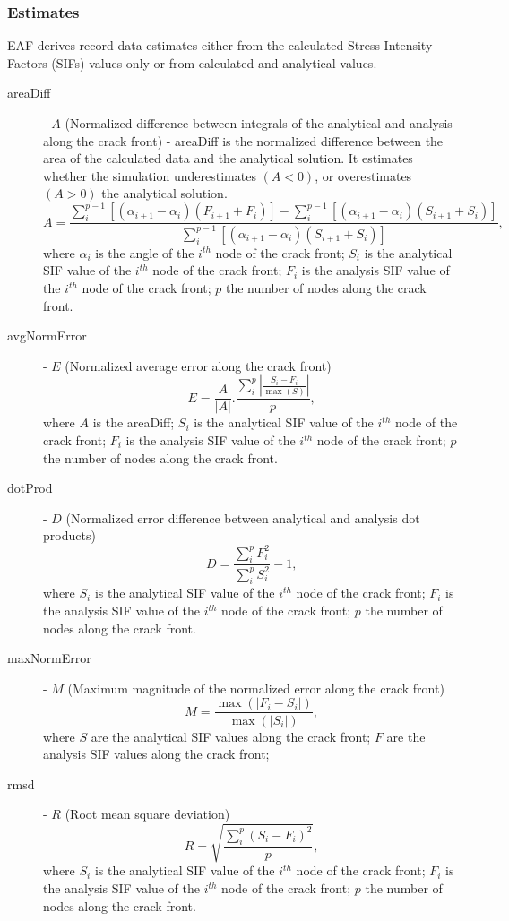\documentclass[10pt,a4paper]{article}
\begin{document}
\subsubsection{Estimates}

EAF derives record data estimates either from the calculated Stress Intensity Factors (SIFs) values only or from calculated and analytical values.

\begin{description}
\item[areaDiff] - $A$ (Normalized difference between integrals of the analytical and analysis along the crack front) - areaDiff is the normalized difference between the area of the calculated data and the analytical solution. It estimates whether the simulation underestimates $(A<0)$, or overestimates $(A>0)$ the analytical solution.
$$
A = \frac{\sum_{i}^{p-1}\left[\left( \alpha_{i+1}-\alpha_{i} \right)\left(F_{i+1} + F_{i} \right)\right] - \sum_{i}^{p-1}\left[\left( \alpha_{i+1}-\alpha_{i} \right)\left(S_{i+1} + S_{i} \right)\right]}{\sum_{i}^{p-1}\left[\left( \alpha_{i+1}-\alpha_{i} \right)\left(S_{i+1} + S_{i} \right)\right]} \text{,}
$$
where $\alpha_{i}$ is the angle of the $i^{th}$ node of the crack front;
$S_{i}$ is the analytical SIF value of the $i^{th}$ node of the crack front;
$F_{i}$ is the analysis SIF value of the $i^{th}$ node of the crack front;
$p$ the number of nodes along the crack front.


\item[avgNormError] - $E$ (Normalized average error along the crack front)
$$
E = \frac{A}{|A|}.\frac{\sum_{i}^{p}\left|\frac{S_{i}-F_{i}}{\max(S)}\right|}{p} \text{,}
$$
where $A$ is the areaDiff;
$S_{i}$ is the analytical SIF value of the $i^{th}$ node of the crack front;
$F_{i}$ is the analysis SIF value of the $i^{th}$ node of the crack front;
$p$ the number of nodes along the crack front.

\item[dotProd] - $D$ (Normalized error difference between analytical and analysis dot products)
$$
D = \frac{\sum_{i}^{p}F_i^2 }{\sum_{i}^{p}S_i^2} - 1 \text{,}
$$
where $S_{i}$ is the analytical SIF value of the $i^{th}$ node of the crack front;
$F_{i}$ is the analysis SIF value of the $i^{th}$ node of the crack front;
$p$ the number of nodes along the crack front.
\item[maxNormError] - $M$ (Maximum magnitude of the normalized error along the crack front)
$$
M = \frac{\max(\left| F_i - S_i \right|)}{\max(\left| S_i \right| )} \text{,}
$$
where $S$ are the analytical SIF values along the crack front;
$F$ are the analysis SIF values along the crack front;
\item[rmsd] - $R$ (Root mean square deviation)
$$
R = \sqrt{\frac{\sum_{i}^{p}\left(S_i - F_i \right)^2}{p}} \text{,}
$$
where $S_{i}$ is the analytical SIF value of the $i^{th}$ node of the crack front;
$F_{i}$ is the analysis SIF value of the $i^{th}$ node of the crack front;
$p$ the number of nodes along the crack front.
\end{description}
\end{document}
